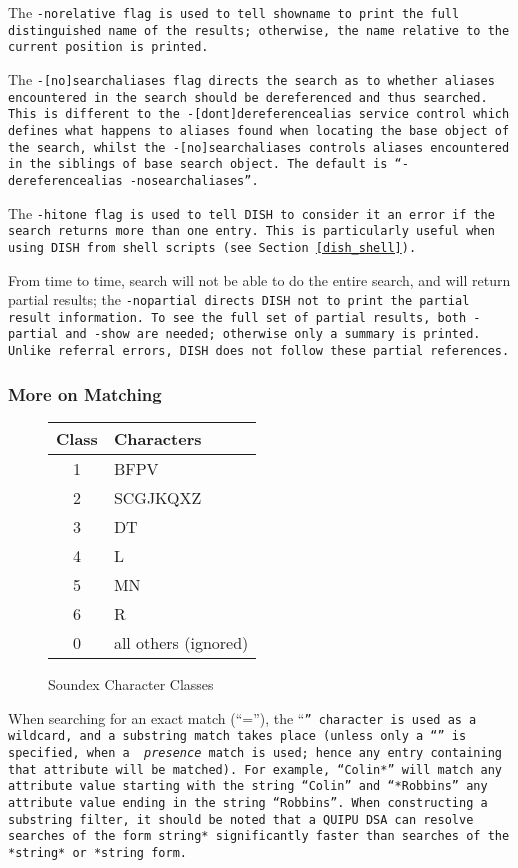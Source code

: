 The \tt -norelative\rm \ flag is used to tell \verb"showname" to print the full
distinguished name of the results; otherwise, the name relative to the current
position is printed.

The \tt -[no]searchaliases\rm \ flag directs the search as to whether aliases
encountered in the search should be dereferenced and thus searched.
This is different to the \tt -[dont]dereferencealias\rm \ service control which
defines what happens to 
aliases found when locating the base object of the search, whilst the 
\tt -[no]searchaliases\rm \ controls aliases encountered in the siblings of 
base search object.
The default is ``\tt -dereferencealias -nosearchaliases\rm ''.

The \tt -hitone\rm \ flag is used to tell DISH to consider it an error if
the search returns more than one entry.  This is particularly useful when
using DISH from shell scripts (see Section~\ref{dish_shell}).

From time to time, search will not be able to do the entire search, and will
return partial results; the \tt -nopartial\rm \ directs DISH not to print
the partial result information.  To see the full set of partial results, both
\tt -partial\rm \ and \tt -show\rm \ are needed; otherwise only a summary is
printed.
Unlike referral errors, DISH does not follow these partial references.

\subsubsection{More on Matching}

\begin{figure}[tp]
\begin{center}
\small
\begin{tabular}{|c|l|}
\hline
Class	&	Characters\\
\hline
1       &	BFPV\\
2	&	SCGJKQXZ\\
3	&	DT\\
4	&	L\\
5	&	MN\\
6	&	R\\
0	&	all others (ignored)\\
\hline
\end{tabular}
\end{center}
\caption{Soundex Character Classes}
\label{soundex:classes}
\end{figure}


When searching for an exact match (``=''),
the ``\tt *\rm '' character is used as a wildcard, and a substring
match takes place (unless only a ``\tt *\rm '' is specified, when a {\em
presence} match is used; hence any entry 
containing that attribute will be matched). 
For example, ``\verb+Colin*+'' will 
match any attribute value starting with the 
string ``\verb+Colin+'' and ``\verb+*Robbins+'' any 
attribute value ending in the 
string ``\verb+Robbins+''.
When constructing a substring filter, it should be noted that a QUIPU
DSA can resolve searches of the form \verb+string*+ significantly faster
than searches of the \verb+*string*+ or \verb+*string+ form.

